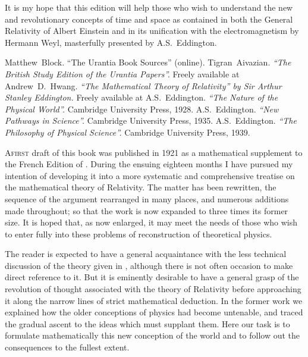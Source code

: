 \documentclass[12pt]{book}
\begin{document}
It is my hope that this edition will help those who wish to understand the new and revolutionary concepts of
time and space as contained in both the General Relativity of Albert Einstein and in its unification with the
electromagnetism by Hermann Weyl, masterfully presented by A.S.~Eddington.


\begin{thebibliography}{100}
Matthew~Block.
{``The Urantia Book Sources'' (online).}
{}
Tigran~Aivazian.
{\em ``The British Study Edition of the Urantia Papers''.}
{Freely available at }
Andrew~D.~Hwang.
{\em ``The Mathematical Theory of Relativity'' by Sir Arthur Stanley Eddington.}
{Freely available at }
A.S.~Eddington.
{\em ``The Nature of the Physical World''.}
{Cambridge University Press,} 1928.
A.S.~Eddington.
{\em ``New Pathways in Science''.}
{Cambridge University Press,} 1935.
A.S.~Eddington.
{\em ``The Philosophy of Physical Science''.}
{Cambridge University Press,} 1939.
\end{thebibliography}


\lettrine{A}{first} draft of this book was published in 1921 as a mathematical supplement
to the French Edition of . During
the ensuing eighteen months I have pursued my intention of developing it
into a more systematic and comprehensive treatise on the mathematical
theory of Relativity. The matter has been rewritten, the sequence of the argument
rearranged in many places, and numerous additions made throughout;
so that the work is now expanded to three times its former size. It is hoped
that, as now enlarged, it may meet the needs of those who wish to enter fully
into these problems of reconstruction of theoretical physics.

The reader is expected to have a general acquaintance with the less
technical discussion of the theory given in ,
although there is not often occasion to make direct reference to it. But it is
eminently desirable to have a general grasp of the revolution of thought
associated with the theory of Relativity before approaching it along the
narrow lines of strict mathematical deduction. In the former work we explained
how the older conceptions of physics had become untenable, and traced
the gradual ascent to the ideas which must supplant them. Here our task is
to formulate mathematically this new conception of the world and to follow
out the consequences to the fullest extent.
\end{document}
